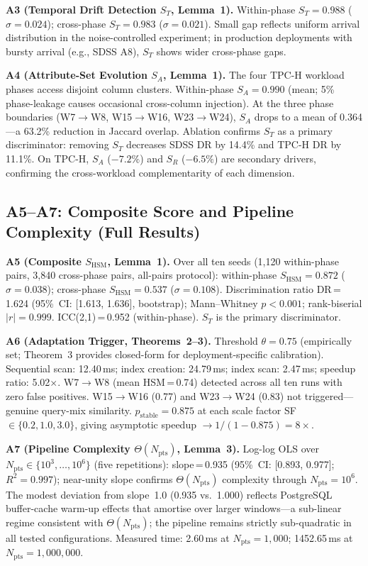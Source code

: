 \documentclass[10pt,twocolumn,a4paper]{article}
\newcommand{\SHSM}{S_{\mathrm{HSM}}}
\newcommand{\SR}{S_{R}}
\newcommand{\ST}{S_{T}}
\newcommand{\SA}{S_{A}}
\newcommand{\Npts}{N_{\mathrm{pts}}}
\begin{document}
\textbf{A3 (Temporal Drift Detection $\ST$, Lemma~1).} Within-phase
$\ST\!=\!0.988$ ($\sigma\!=\!0.024$); cross-phase $\ST\!=\!0.983$
($\sigma\!=\!0.021$). Small gap reflects uniform arrival distribution in
the noise-controlled experiment; in production deployments with bursty
arrival (e.g., SDSS A8), $\ST$ shows wider cross-phase gaps.

\textbf{A4 (Attribute-Set Evolution $\SA$, Lemma~1).} The four TPC-H workload
phases access disjoint column clusters. Within-phase $\SA\!=\!0.990$
(mean; 5\% phase-leakage causes occasional cross-column injection). At
the three phase boundaries (W7$\to$W8, W15$\to$W16, W23$\to$W24), $\SA$
drops to a mean of 0.364---a 63.2\% reduction in Jaccard overlap.
Ablation confirms $\ST$ as a primary
discriminator: removing $\ST$ decreases SDSS DR by 14.4\%
and TPC-H DR by 11.1\%.
On TPC-H, $\SA$ ($-7.2\%$) and $\SR$ ($-6.5\%$) are secondary drivers,
confirming the cross-workload complementarity of each dimension.

\subsection{A5--A7: Composite Score and Pipeline Complexity (Full Results)}

\textbf{A5 (Composite $\SHSM$, Lemma~1).} Over all ten seeds (1{,}120 within-phase
pairs, 3{,}840 cross-phase pairs, all-pairs protocol):
within-phase $\SHSM\!=\!0.872$ ($\sigma\!=\!0.038$);
cross-phase $\SHSM\!=\!0.537$ ($\sigma\!=\!0.108$).
Discrimination ratio DR\,=\,1.624 (95\%~CI: [1.613, 1.636], bootstrap);
Mann--Whitney $p\!<\!0.001$; rank-biserial $|r|\!=\!0.999$.
ICC(2,1)\,=\,0.952 (within-phase). $\ST$ is the primary discriminator.

\textbf{A6 (Adaptation Trigger, Theorems~2--3).} Threshold $\theta\!=\!0.75$
(empirically set; Theorem~3 provides closed-form for deployment-specific
calibration). Sequential scan: 12.40\,ms; index creation: 24.79\,ms;
index scan: 2.47\,ms; speedup ratio: 5.02$\times$. W7$\to$W8 (mean
HSM\,=\,0.74) detected across all ten runs with zero false positives.
W15$\to$W16 (0.77) and W23$\to$W24 (0.83) not triggered---genuine
query-mix similarity. $p_{\mathrm{stable}}\!=\!0.875$ at each scale
factor SF\,$\in\{0.2,1.0,3.0\}$, giving asymptotic speedup
$\to\!1/(1-0.875)\!=\!8\times$.

\textbf{A7 (Pipeline Complexity $\Theta(\Npts)$, Lemma~3).} Log-log OLS over
$\Npts\!\in\!\{10^3,\ldots,10^6\}$ (five repetitions): slope\,=\,0.935
(95\%~CI: [0.893, 0.977]; $R^2\!=\!0.997$); near-unity slope confirms
$\Theta(\Npts)$ complexity through $\Npts\!=\!10^6$. The modest deviation
from slope~1.0 (0.935 vs.\ 1.000) reflects PostgreSQL buffer-cache
warm-up effects that amortise over larger windows---a sub-linear regime
consistent with $\Theta(\Npts)$; the pipeline remains strictly
sub-quadratic in all tested configurations. Measured time:
2.60\,ms at $\Npts\!=\!1{,}000$; 1452.65\,ms at $\Npts\!=\!1{,}000{,}000$.
\end{document}
